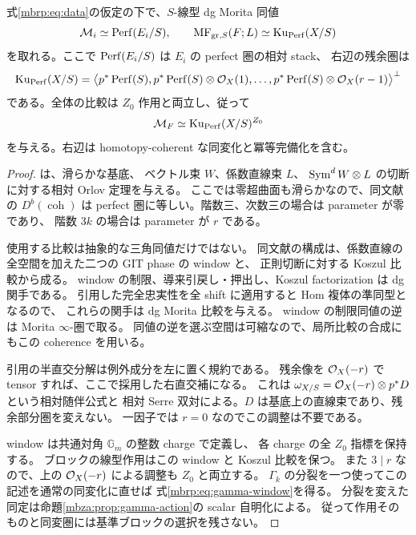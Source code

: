 \begin{lemma}
\label{mbrp:lem:relative-orlov}
式\eqref{mbrp:eq:data}の仮定の下で、$S$-線型 dg Morita 同値
\begin{equation}\label{mbrp:eq:relative-orlov}
 \mathcal M_i\simeq\operatorname{Perf}(E_i/S),\qquad
 \operatorname{MF}_{\mathrm{gr},S}(F;L)\simeq\operatorname{Ku}_{\operatorname{Perf}}(X/S)
\end{equation}
を取れる。ここで $\operatorname{Perf}(E_i/S)$ は $E_i$ の perfect 圏の相対 stack、
右辺の残余圏は
\[
 \operatorname{Ku}_{\operatorname{Perf}}(X/S)=
 \bigl\langle p^*\operatorname{Perf}(S),p^*\operatorname{Perf}(S)\otimes\mathcal O_X(1),
                  \ldots,p^*\operatorname{Perf}(S)\otimes\mathcal O_X(r-1)\bigr\rangle^\perp
\]
である。全体の比較は $Z_0$ 作用と両立し、従って
\begin{equation}\label{mbrp:eq:gamma-window}
 \mathcal M_F\simeq\operatorname{Ku}_{\operatorname{Perf}}(X/S)^{Z_0}
\end{equation}
を与える。右辺は homotopy-coherent な同変化と冪等完備化を含む。
\end{lemma}
\begin{proof}
\cite[Section~3, Corollary~3.4]{MBRPBDFIK}は、滑らかな基底、
ベクトル束 $W$、係数直線束 $L$、
$\operatorname{Sym}^dW\otimes L$ の切断に対する相対 Orlov 定理を与える。
ここでは零超曲面も滑らかなので、同文献の $D^b(\operatorname{coh})$ は
perfect 圏に等しい。階数三、次数三の場合は parameter が零であり、
階数 $3k$ の場合は parameter が $r$ である。

使用する比較は抽象的な三角同値だけではない。
同文献の構成は、係数直線の全空間を加えた二つの GIT phase の window と、
正則切断に対する Koszul 比較から成る。
window の制限、導来引戻し・押出し、Koszul factorization は dg 関手である。
引用した完全忠実性を全 shift に適用すると Hom 複体の準同型となるので、
これらの関手は dg Morita 比較を与える。
window の制限同値の逆は Morita $\infty$-圏で取る。
同値の逆を選ぶ空間は可縮なので、局所比較の合成にもこの coherence を用いる。

引用の半直交分解は例外成分を左に置く規約である。
残余像を $\mathcal O_X(-r)$ で tensor すれば、ここで採用した右直交補になる。
これは $\omega_{X/S}=\mathcal O_X(-r)\otimes p^*D$ という相対随伴公式と
相対 Serre 双対による。$D$ は基底上の直線束であり、残余部分圏を変えない。
一因子では $r=0$ なのでこの調整は不要である。

window は共通対角 $\mathbb G_m$ の整数 charge で定義し、
各 charge の全 $Z_0$ 指標を保持する。
ブロックの線型作用はこの window と Koszul 比較を保つ。
また $3\mid r$ なので、上の $\mathcal O_X(-r)$ による調整も $Z_0$ と両立する。
$\Gamma_k$ の分裂を一つ使ってこの記述を通常の同変化に直せば
式\eqref{mbrp:eq:gamma-window}を得る。
分裂を変えた同定は命題\ref{mbza:prop:gamma-action}の scalar 自明化による。
従って作用そのものと同変圏には基準ブロックの選択を残さない。
\end{proof}

